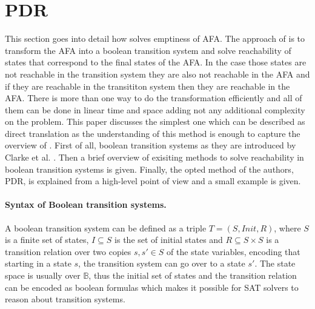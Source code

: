 \section{PDR}
This section goes into detail how \sloth solves emptiness of AFA. 
The approach of \sloth is to transform the AFA into a boolean transition system and solve reachability of states that correspond to the final states of the AFA. 
In the case those states are not reachable in the transition system they are also not reachable in the AFA and if they are reachable in the transititon system then they are reachable in the AFA.
There is more than one way to do the transformation efficiently and all of them can be done in linear time and space adding not any additional complexity on the problem.
This paper discusses the simplest one which can be described as direct translation as the understanding of this method is enough to capture the overview of \sloth.
First of all, boolean transition systems as they are introduced by Clarke et al. \cite{??}.
Then a brief overview of exisiting methods to solve reachability in boolean transition systems is given.
Finally, the opted method of the authors, PDR, is explained from a high-level point of view and a small example is given.
\paragraph*{Syntax of Boolean transition systems.} A boolean transition system can be defined as a triple $T = (S, Init, R)$, where $S$ is a finite set of states, $I \subseteq S$ is the set of initial states and $R \subseteq S \times S$ is a transition relation over two copies $s, s' \in S$ of the state variables, encoding that starting in a state $s$, the transition system can go over to a state $s'$.
The state space is usually over $\mathbb{B}$, thus the initial set of states and the transition relation can be encoded as boolean formulas which makes it possible for SAT solvers to reason about transition systems.
